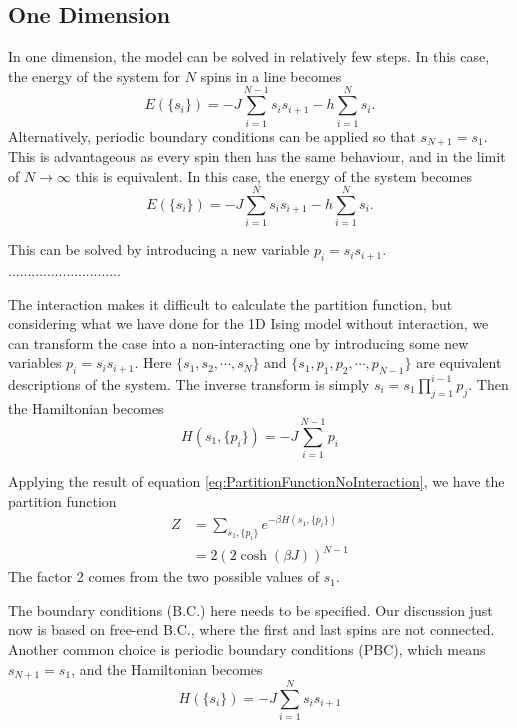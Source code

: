 \documentclass[11pt]{article}
\begin{document}
	\subsection{One Dimension}
	
	In one dimension, the model can be solved in relatively few steps. In this case, the energy of the system for $N$ spins in a line becomes
	\begin{equation}
		E(\{s_i\}) = -J \sum_{i=1}^{N-1} s_i s_{i+1} -h\sum_{i=1}^N s_i.
	\end{equation}
	Alternatively, periodic boundary conditions can be applied so that $s_{N+1} = s_1$. This is advantageous as every spin then has the same behaviour, and in the limit of $N \to \infty$ this is equivalent. In this case, the energy of the system becomes
	\begin{equation} \label{eq:Energy1D}
		E(\{s_i\}) = -J \sum_{i=1}^{N} s_i s_{i+1} -h\sum_{i=1}^N s_i.
	\end{equation}

	This can be solved by introducing a new variable $p_i = s_is_{i + 1}$.\\
	
	.............................

	The interaction makes it difficult to calculate the partition function, 
	but considering what we have done for the 1D Ising model without interaction, 
	we can transform the case into a non-interacting one by introducing some new variables $p_i = s_i s_{i+1}$.
	Here $\{s_1, s_2, \cdots, s_N\}$ and $\{s_1, p_1, p_2, \cdots, p_{N-1}\}$ are equivalent descriptions of the system.
	The inverse transform is simply $s_i = s_1 \prod_{j=1}^{i-1} p_j$.
	Then the Hamiltonian becomes
	\begin{equation} \label{eq:Hamiltonian1DNoFieldTransformed}
		H(s_1, \{p_i\}) = -J \sum_{i=1}^{N-1} p_i
	\end{equation}

	Applying the result of equation \ref{eq:PartitionFunctionNoInteraction}, we have the partition function
	\begin{equation} \label{eq:PartitionFunction1DNoField}
		\begin{aligned}
			Z &= \sum_{s_1, \{p_i\}} e^{-\beta H(s_1, \{p_i\})} \\
			&= 2(2\cosh(\beta J))^{N-1}
		\end{aligned}
	\end{equation}
	The factor 2 comes from the two possible values of $s_1$.

	The boundary conditions (B.C.) here needs to be specified.
	Our discussion just now is based on free-end B.C., where the first and last spins are not connected.
	Another common choice is periodic boundary conditions (PBC), which means $s_{N+1} = s_1$, and the Hamiltonian becomes
	\begin{equation} \label{eq:Hamiltonian1DNoFieldPeriodic}
		H(\{s_i\}) = -J \sum_{i=1}^{N} s_i s_{i+1}
	\end{equation}
\end{document}
